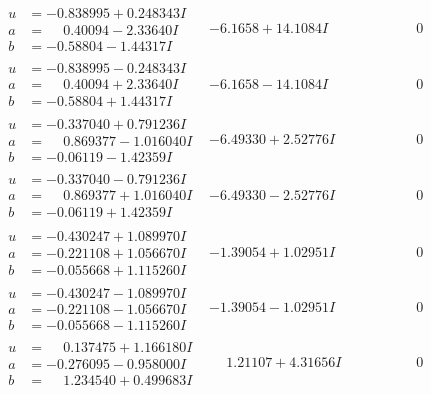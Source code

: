 \documentclass[1p]{elsarticle_modified}
\theoremstyle{definition}
\begin{document}
$$\begin{array}{c|c|c}
\begin{aligned}
u &= -0.838995 + 0.248343 I \\
a &= \phantom{-}0.40094 - 2.33640 I \\
b &= -0.58804 - 1.44317 I\end{aligned}
 & -6.1658 + 14.1084 I & \phantom{-0.000000 } 0 \\ \hline\begin{aligned}
u &= -0.838995 - 0.248343 I \\
a &= \phantom{-}0.40094 + 2.33640 I \\
b &= -0.58804 + 1.44317 I\end{aligned}
 & -6.1658 - 14.1084 I & \phantom{-0.000000 } 0 \\ \hline\begin{aligned}
u &= -0.337040 + 0.791236 I \\
a &= \phantom{-}0.869377 - 1.016040 I \\
b &= -0.06119 - 1.42359 I\end{aligned}
 & -6.49330 + 2.52776 I & \phantom{-0.000000 } 0 \\ \hline\begin{aligned}
u &= -0.337040 - 0.791236 I \\
a &= \phantom{-}0.869377 + 1.016040 I \\
b &= -0.06119 + 1.42359 I\end{aligned}
 & -6.49330 - 2.52776 I & \phantom{-0.000000 } 0 \\ \hline\begin{aligned}
u &= -0.430247 + 1.089970 I \\
a &= -0.221108 + 1.056670 I \\
b &= -0.055668 + 1.115260 I\end{aligned}
 & -1.39054 + 1.02951 I & \phantom{-0.000000 } 0 \\ \hline\begin{aligned}
u &= -0.430247 - 1.089970 I \\
a &= -0.221108 - 1.056670 I \\
b &= -0.055668 - 1.115260 I\end{aligned}
 & -1.39054 - 1.02951 I & \phantom{-0.000000 } 0 \\ \hline\begin{aligned}
u &= \phantom{-}0.137475 + 1.166180 I \\
a &= -0.276095 - 0.958000 I \\
b &= \phantom{-}1.234540 + 0.499683 I\end{aligned}
 & \phantom{-}1.21107 + 4.31656 I & \phantom{-0.000000 } 0 \\ \hline\begin{aligned}

\end{aligned}
\end{array}$$
\end{document}
